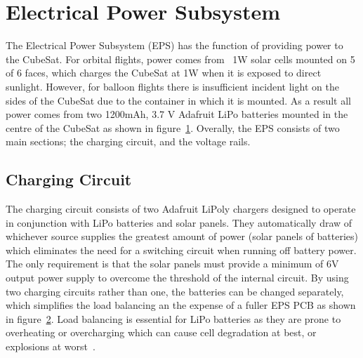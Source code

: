 \section{Electrical Power Subsystem}

The Electrical Power Subsystem (EPS) has the function of providing power to the CubeSat.  For orbital flights, power comes from ~1W solar cells mounted on 5 of 6 faces, which charges the CubeSat at 1W when it is exposed to direct sunlight.  However, for balloon flights there is insufficient incident light on the sides of the CubeSat due to the container in which it is mounted.  As a result all power comes from two 1200mAh, 3.7 V Adafruit LiPo batteries mounted in the centre of the CubeSat as shown in figure~\ref{fig:epsloc}.
Overally, the EPS consists of two main sections; the charging circuit, and the voltage rails.

\begin{figure}[H]
	\label{fig:epsloc}
\end{figure} 

\subsection{Charging Circuit}
The charging circuit consists of two Adafruit LiPoly chargers designed to operate in conjunction with LiPo batteries and solar panels.  They automatically draw of whichever source supplies the greatest amount of power (solar panels of batteries) which eliminates the need for a switching circuit when running off battery power.  The only requirement is that the solar panels must provide a minimum of 6V output power supply to overcome the threshold of the internal circuit.  By using two charging circuits rather than one, the batteries can be changed separately, which simplifies the load balancing an the expense of a fuller EPS PCB as shown in figure~\ref{fig:epspcb}.  Load balancing is essential for LiPo batteries as they are prone to overheating or overcharging which can cause cell degradation at best, or explosions at worst~\cite{explode}.

\begin{figure}[H]
	\label{fig:epspcb}
\end{figure}

